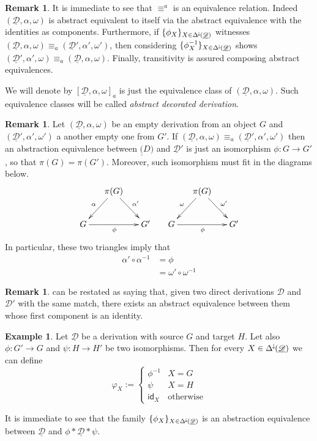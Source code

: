 \documentclass[a4paper]{article}
\newcommand{\Deltamin}{\Delta^{\hspace{-1pt}\downarrow\hspace{-1pt}}}
\newcommand{\id}[1]{\mathsf{id}_{#1}}
\newcommand{\dder}[1]{\mathscr{#1}}
\newcommand{\der}[1]{\underline{\dder{#1}}}
\theoremstyle{definition}
\newtheorem{remark}[theorem]{Remark}
\newtheorem{example}[theorem]{Example}
\begin{document}
\begin{remark}\label{rem:equi}
	It is immediate to see that $\equiv^a$ is an equivalence relation. Indeed $(\der{D}, \alpha, \omega)$ is abstract equivalent to itself via the abstract equivalence with the identities as components. Furthermore, if  $\{\phi_X\}_{X\in \Deltamin(\der{D})}$  witnesses $(\der{D}, \alpha, \omega)\equiv_a (\der{D}', \alpha', \omega')$, then considering $\{\phi^{-1}_X\}_{X\in \Deltamin(\der{D})}$ shows $(\der{D}', \alpha', \omega)\equiv_a (\der{D}, \alpha, \omega)$. Finally, transitivity is assured composing abstract equivalences. 
	
	We will denote by $[\der{D}, \alpha, \omega]_a$ is just the equivalence class of  $(\der{D}, \alpha, \omega)$.
	 Such equivalence classes will be called  \emph{abstract decorated derivation}.  
\end{remark}

\begin{remark}\label{rem:empty}
Let $(\der{D},\alpha, \omega)$ be an empty derivation from an object $G$ and  $(\der{D}',\alpha', \omega')$ a another empty one from $G'$.  If $(\der{D},\alpha, \omega)\equiv_a(\der{D}',\alpha', \omega')$ then an abstraction equivalence between $\der(D)$ and $\der{D}'$ is just an isomorphism $\phi\colon G\to G'$, so that $\pi(G)=\pi(G')$. Moreover, such isomorphism must fit in the diagrams below.
\[\xymatrix@C=15pt{&\pi(G) \ar[dr]^{\alpha'} \ar[dl]_{\alpha}&&& \pi(G) \ar[dr]^{\omega'} \ar[dl]_{\omega}\\ G\ar[rr]_{\phi} && G' &G \ar[rr]_{\phi} && G' } \]
In particular, these two triangles imply that
\begin{align*}
	\alpha'\circ \alpha^{-1}&=\phi \\&=\omega'\circ \omega^{-1}
\end{align*}
\end{remark}

\begin{remark}\label{rem:res}  can be restated as saying that, given two direct derivations $\dder{D}$ and $\dder{D'}$ with the same match, there exists an abstract equivalence between them whose first component is an identity.
\end{remark}

\begin{example}\label{rem:absequi}
	Let $\der{D}$ be a derivation with source $G$ and target $H$. Let also $\phi:G'\to G$ and $\psi:H\to H'$ be two isomorphisms. Then for every $X\in \Deltamin(\der{D})$ we can define 
	\[\varphi_X:=\begin{cases}
		\phi^{-1} & X=G\\
		\psi & X=H\\
		\id{X} & \text{otherwise}
	\end{cases}\]

It is immediate to see that the family $\{\phi_X\}_{X\in \Deltamin(\der{D})}$ is an abstraction equivalence between $\der{D}$ and $\phi *\der{D}*\psi$.	
\end{example}
\end{document}
